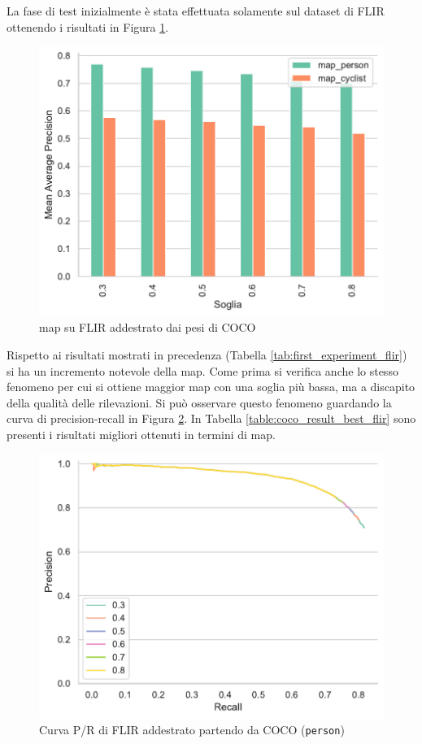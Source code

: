 La fase di test inizialmente è stata effettuata solamente sul dataset di FLIR ottenendo i risultati in Figura \ref{fig:map_flir_from_coco}. 
\begin{figure}[]
    \centering
    \includegraphics[width=\textwidth]{images/graphic/flir_from_coco_map.pdf}
    \caption{\ac{map} su FLIR addestrato dai pesi di COCO}
    \label{fig:map_flir_from_coco}
\end{figure}
Rispetto ai risultati mostrati in precedenza (Tabella \ref{tab:first_experiment_flir}) si ha un incremento notevole della \ac{map}. Come prima si verifica anche lo stesso fenomeno per cui si ottiene maggior \ac{map} con una soglia più bassa, ma a discapito della qualità delle rilevazioni. Si può osservare questo fenomeno guardando la curva di precision-recall in Figura \ref{fig:precision_recall_curve_flir_coco}. In Tabella \ref{table:coco_result_best_flir} sono presenti i risultati migliori ottenuti in termini di \ac{map}. 
\begin{figure}[]
    \centering
    \includegraphics[width = \textwidth]{images/graphic/flir_coco_pr.pdf}
    \caption{Curva P/R di FLIR addestrato partendo da COCO (\texttt{person})}
    \label{fig:precision_recall_curve_flir_coco}
\end{figure}

